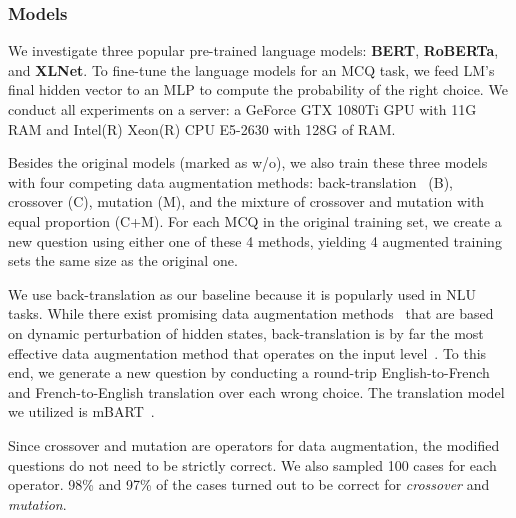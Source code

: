 \subsubsection{Models}
We investigate three popular pre-trained language models: \textbf{BERT}, \textbf{RoBERTa}, and \textbf{XLNet}. 
To fine-tune the language models for an MCQ task, we feed LM's final hidden
vector to an MLP to compute the probability of the right choice.
We conduct all experiments on a server: 
a GeForce GTX 1080Ti GPU with 11G RAM and Intel(R) Xeon(R) CPU E5-2630 with 128G of RAM.

%
%
%
Besides the original models (marked as w/o), we also train these three
models with four competing data augmentation methods: 
back-translation~\cite{back2019} (B),  crossover (C), mutation (M),
and the mixture of crossover and mutation with equal proportion (C+M). 
For each MCQ in the original training set, we create a new question using either one of
these 4 methods, yielding 4 augmented training sets the same size
as the original one.

We use back-translation as our baseline because it is 
popularly used in NLU tasks. While there exist promising data augmentation 
methods~\cite{qu2020coda,chen-etal-2021-hiddencut} that are based on dynamic perturbation of 
hidden states, back-translation is by far the most
effective data augmentation method that operates on the input level~\cite{kumar2020data}.
To this end, we generate a new question by conducting a round-trip English-to-French and 
French-to-English translation over each wrong choice. The translation model we utilized is mBART~\cite{liu2020multilingual}. 

Since crossover and mutation are operators for data augmentation, 
the modified questions do not need to be strictly correct. 
We also sampled 100 cases for each operator. 98\% and 97\% of the cases turned out
to be correct for \textit{crossover} and \textit{mutation}. 


